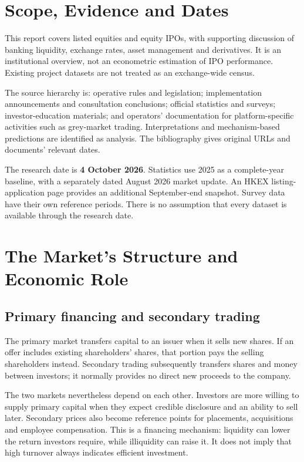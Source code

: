 \documentclass[11pt,a4paper]{article}
\begin{document}
\section{Scope, Evidence and Dates}
This report covers listed equities and equity IPOs, with supporting discussion of banking liquidity, exchange rates, asset management and derivatives. It is an institutional overview, not an econometric estimation of IPO performance. Existing project datasets are not treated as an exchange-wide census.

The source hierarchy is: operative rules and legislation; implementation announcements and consultation conclusions; official statistics and surveys; investor-education materials; and operators' documentation for platform-specific activities such as grey-market trading. Interpretations and mechanism-based predictions are identified as analysis. The bibliography gives original URLs and documents' relevant dates.

The research date is \textbf{4 October 2026}. Statistics use 2025 as a complete-year baseline, with a separately dated August 2026 market update. An HKEX listing-application page provides an additional September-end snapshot. Survey data have their own reference periods. There is no assumption that every dataset is available through the research date.

\section{The Market's Structure and Economic Role}
\subsection{Primary financing and secondary trading}
The primary market transfers capital to an issuer when it sells new shares. If an offer includes existing shareholders' shares, that portion pays the selling shareholders instead. Secondary trading subsequently transfers shares and money between investors; it normally provides no direct new proceeds to the company.

The two markets nevertheless depend on each other. Investors are more willing to supply primary capital when they expect credible disclosure and an ability to sell later. Secondary prices also become reference points for placements, acquisitions and employee compensation. This is a financing mechanism: liquidity can lower the return investors require, while illiquidity can raise it. It does not imply that high turnover always indicates efficient investment.
\end{document}
